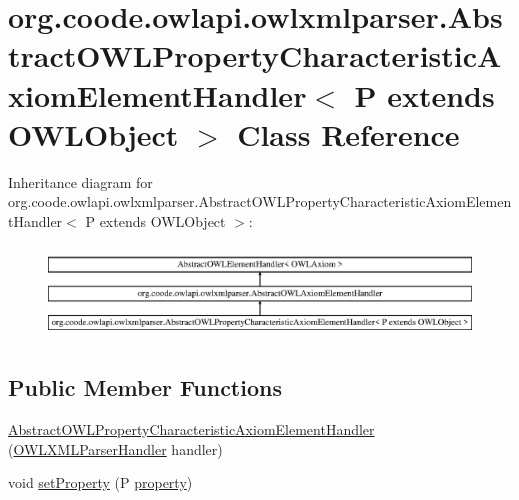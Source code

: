 \hypertarget{classorg_1_1coode_1_1owlapi_1_1owlxmlparser_1_1_abstract_o_w_l_property_characteristic_axiom_ele9cffca01c8ac3125149e1d413d627e29}{\section{org.\-coode.\-owlapi.\-owlxmlparser.\-Abstract\-O\-W\-L\-Property\-Characteristic\-Axiom\-Element\-Handler$<$ P extends O\-W\-L\-Object $>$ Class Reference}
\label{classorg_1_1coode_1_1owlapi_1_1owlxmlparser_1_1_abstract_o_w_l_property_characteristic_axiom_ele9cffca01c8ac3125149e1d413d627e29}
}
Inheritance diagram for org.\-coode.\-owlapi.\-owlxmlparser.\-Abstract\-O\-W\-L\-Property\-Characteristic\-Axiom\-Element\-Handler$<$ P extends O\-W\-L\-Object $>$\-:\begin{figure}[H]
\begin{center}
\leavevmode
\includegraphics[height=2.485207cm]{classorg_1_1coode_1_1owlapi_1_1owlxmlparser_1_1_abstract_o_w_l_property_characteristic_axiom_ele9cffca01c8ac3125149e1d413d627e29}
\end{center}
\end{figure}
\subsection*{Public Member Functions}
\begin{DoxyCompactItemize}
\item 
\hyperlink{classorg_1_1coode_1_1owlapi_1_1owlxmlparser_1_1_abstract_o_w_l_property_characteristic_axiom_ele9cffca01c8ac3125149e1d413d627e29_a7b0fc6f58546d7eb3b7f89a0e2210451}{Abstract\-O\-W\-L\-Property\-Characteristic\-Axiom\-Element\-Handler} (\hyperlink{classorg_1_1coode_1_1owlapi_1_1owlxmlparser_1_1_o_w_l_x_m_l_parser_handler}{O\-W\-L\-X\-M\-L\-Parser\-Handler} handler)
\item 
void \hyperlink{classorg_1_1coode_1_1owlapi_1_1owlxmlparser_1_1_abstract_o_w_l_property_characteristic_axiom_ele9cffca01c8ac3125149e1d413d627e29_a70b29a01a0f3fe36953554ee664f5fd6}{set\-Property} (P \hyperlink{classorg_1_1coode_1_1owlapi_1_1owlxmlparser_1_1_abstract_o_w_l_property_characteristic_axiom_ele9cffca01c8ac3125149e1d413d627e29_a90c94b32dc335fe76fe30bb008abc9fd}{property})
\end{DoxyCompactItemize}
